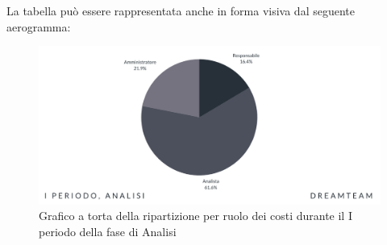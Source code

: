 La tabella può essere rappresentata anche in forma visiva dal seguente aerogramma:
\begin{figure}[!h]
\centering
\includegraphics[scale=0.65]{Sezioni/SezioniPreventivo/grafici/Analisi_I_periodo_costi.png}
\caption{Grafico a torta della ripartizione per ruolo dei costi durante il I periodo della fase di Analisi}
\end{figure}




